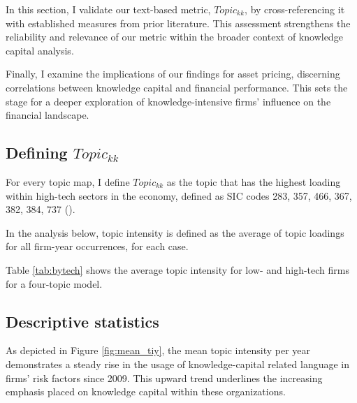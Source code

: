 \documentclass[12pt, letterpaper]{article}
\begin{document}
In this section, I validate our text-based metric, $Topic_{kk}$, by cross-referencing it with established measures from prior literature. This assessment strengthens the reliability and relevance of our metric within the broader context of knowledge capital analysis.

Finally, I examine the implications of our findings for asset pricing, discerning correlations between knowledge capital and financial performance. This sets the stage for a deeper exploration of knowledge-intensive firms' influence on the financial landscape.

\subsection{Defining $Topic_{kk}$}

For every topic map, I define $Topic_{kk}$ as the topic that has the highest loading within high-tech sectors in the economy, defined as SIC codes 283, 357, 466, 367, 382, 384, 737 (\cite{Brown2009-zp}). 

In the analysis below, topic intensity is defined as the average of topic loadings for all firm-year occurrences, for each case.

Table \ref{tab:bytech} shows the average topic intensity for low- and high-tech firms for a four-topic model. 




\subsection{Descriptive statistics}

As depicted in Figure \ref{fig:mean_tiy}, the mean topic intensity per year demonstrates a steady rise in the usage of knowledge-capital related language in firms' risk factors since 2009. This upward trend underlines the increasing emphasis placed on knowledge capital within these organizations.


%
\end{document}
